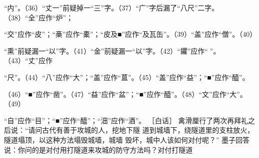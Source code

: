 \documentclass[12pt,UTF8]{ctexbook}
\begin{document}
“内”。（36）“丈一”前疑掉一“三”字。（37）“广”字后漏了“八尺”二字。（38）“全”应作“炉”； 

“交”应作“皮”；“槀”应作“橐”；“皮及■”应作“及瓦缶”。（39）“盖”应作“僧”。（40） 

“熏”前疑漏一“以”字。（41）“金”前疑漏一“以”字。（42）“鑺”应作“”。（43）“丈”应作 

“尺”。（44）“八”应作“大”；“盖”应作“蒀”。（45）“盖”应作“益”；“■”应作“醯”。 

（46）“■”应作“凿”。（47）“益”应作“盆”；“■”应作“醯”。（48）“文”应作“大”。（49） 

“自”应作“目”；“■”应作“醯”；“沺”应作“酒”。 
［白话］ 
禽滑厘行了两次再拜礼之后说：“请问古代有善于攻城的人，挖地下隧 
道到城墙下，绕隧道里的支柱放火，隧道塌顶，以这种方法塌毁城墙，城墙 
毁坏，城中人该如何对付呢？” 
墨子回答说：你问的是对付用打隧道来攻城的防守方法吗？对付打隧道 
\end{document}
